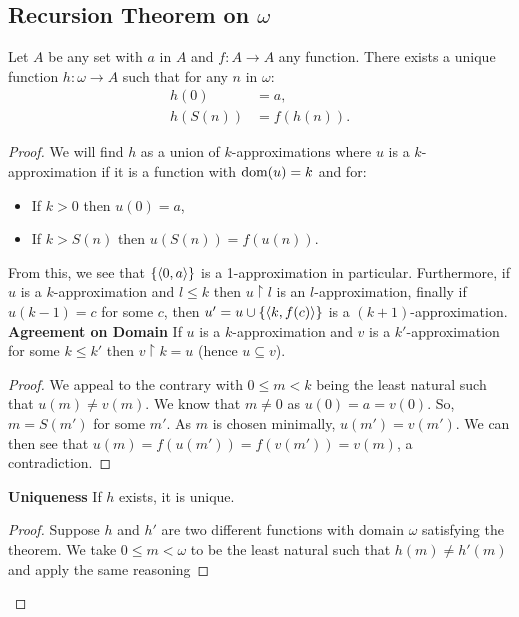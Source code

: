 \subsection{Recursion Theorem on $\omega$}

Let $A$ be any set with $a$ in $A$ and $f : A \to A$ any function.
There exists a unique function $h : \omega \to A$ such that
for any $n$ in $\omega$:
\begin{align*}
    h(0) &= a, \\
    h(S(n)) &= f(h(n)).
\end{align*}

\begin{proof}
    We will find $h$ as a union of $k$-approximations where $u$ is a
    $k$-approximation if it is a function with $\operatorname{dom}(u) = k$ and for:
    \begin{itemize}
        \item If $k > 0$ then $u(0) = a$,
        \item If $k > S(n)$ then $u(S(n)) = f(u(n))$.
    \end{itemize} From this, we see that $\{\langle 0, a \rangle\}$ is a 1-approximation 
    in particular. Furthermore, if $u$ is a $k$-approximation and $l \leq k$
    then $u \upharpoonright l$ is an $l$-approximation, finally
    if $u(k - 1) = c$ for some $c$, then $u' = u \cup \{\langle k, f(c) \rangle\}$
    is a $(k + 1)$-approximation.
    \\[\baselineskip]
    \textbf{Agreement on Domain} \newline 
    If $u$ is a $k$-approximation and $v$ is a
    $k'$-approximation for some $k \leq k'$ then $v \upharpoonright k = u$
    (hence $u \subseteq v$). \begin{proof}
        We appeal to the contrary with $0 \leq m < k$ being the least
        natural such that $u(m) \neq v(m)$. We know that $m \neq 0$ as
        $u(0) = a = v(0)$. So, $m = S(m')$ for some $m'$. As $m$ is chosen
        minimally, $u(m') = v(m')$. We can then see that
        $u(m) = f(u(m')) = f(v(m')) = v(m)$, a contradiction.
    \end{proof}
    \vspace{3mm}\noindent
    \textbf{Uniqueness} \newline
    If $h$ exists, it is unique.
    \begin{proof}
        Suppose $h$ and $h'$ are two different functions with domain $\omega$
        satisfying the theorem. We take $0 \leq m < \omega$ to be the least
        natural such that $h(m) \neq h'(m)$ and apply the same reasoning

\end{proof}
\end{proof}
